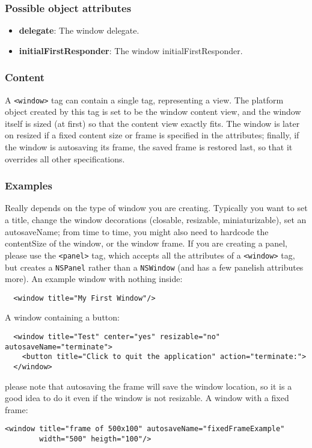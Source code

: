 \subsubsection{Possible object attributes}
\begin{itemize}
\item {\bf delegate}: The window delegate.
\item {\bf initialFirstResponder}: The window initialFirstResponder.
\end{itemize}

\subsubsection{Content}
A \texttt{<window>} tag can contain a single tag, representing a view.
The platform object created by this tag is set to be the window
content view, and the window itself is sized (at first) so that the
content view exactly fits.  The window is later on resized if a fixed
content size or frame is specified in the attributes; finally, if the
window is autosaving its frame, the saved frame is restored last, so
that it overrides all other specifications.

\subsubsection{Examples}
Really depends on the type of window you are creating.  Typically you
want to set a title, change the window decorations (closable,
resizable, miniaturizable), set an autosaveName; from time to time,
you might also need to hardcode the contentSize of the window, or the
window frame.  If you are creating a panel, please use the
\texttt{<panel>} tag, which accepts all the attributes of a \texttt{<window>}
tag, but creates a \texttt{NSPanel} rather than a \texttt{NSWindow}
(and has a few panelish attributes more).  An example window with
nothing inside:
\begin{verbatim}
  <window title="My First Window"/>
\end{verbatim}
A window containing a button:
\begin{verbatim}
  <window title="Test" center="yes" resizable="no" autosaveName="terminate">
    <button title="Click to quit the application" action="terminate:">
  </window>
\end{verbatim}
please note that autosaving the frame will save the window location,
so it is a good idea to do it even if the window is not resizable.  A
window with a fixed frame:
\begin{verbatim}
<window title="frame of 500x100" autosaveName="fixedFrameExample"
        width="500" heigth="100"/>
\end{verbatim}

